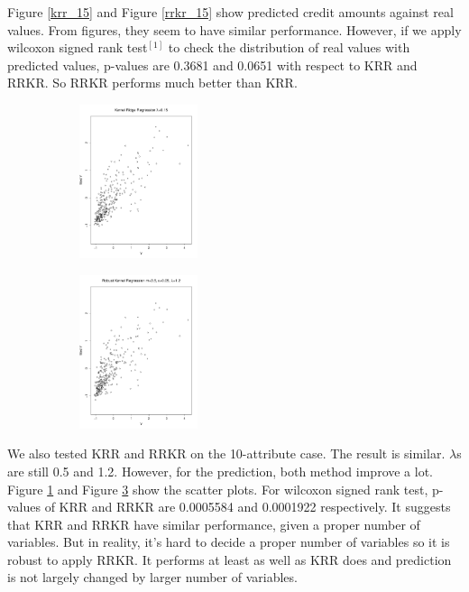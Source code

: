 \documentclass[11pt, oneside]{article}   	%
\newcommand{\reffig}[1]{Figure \ref{#1}\hspace{2pt}}
\begin{document}
\reffig{krr_15} and \reffig{rrkr_15} show predicted credit amounts against real values.  From figures, they seem to have similar performance.  However, if we apply wilcoxon signed rank test$^{[1]}$ to check the distribution of real values with predicted values, p-values are 0.3681 and 0.0651 with respect to KRR and RRKR.  So RRKR performs much better than KRR. \\
\begin{figure}[h]
        \centering
        \begin{subfigure}[b]{0.475\textwidth}
            \centering
            \includegraphics[width=\textwidth, height=4.5cm]{krr_10.pdf}
            \caption{}\label{krr_10}
        \end{subfigure}
        \quad
        \begin{subfigure}[b]{0.475\textwidth}
            \centering
            \includegraphics[width=\textwidth, height=4.5cm]{rrkr_10.pdf}
            \caption{}\label{rrkr_10}
        \end{subfigure}
        \caption{}
\end{figure}

We also tested KRR and RRKR on the 10-attribute case.  The result is similar.  $\lambda$s are still 0.5 and 1.2.  However, for the prediction, both method improve a lot. \reffig{krr_10} and \reffig{rrkr_10} show the scatter plots.  For wilcoxon signed rank test, p-values of KRR and RRKR are 0.0005584 and 0.0001922 respectively. It suggests that KRR and RRKR have similar performance, given a proper number of variables.  But in reality, it's hard to decide a proper number of variables so it is robust to apply RRKR.  It performs at least as well as KRR does and prediction is not largely changed by larger number of variables.
\end{document}
